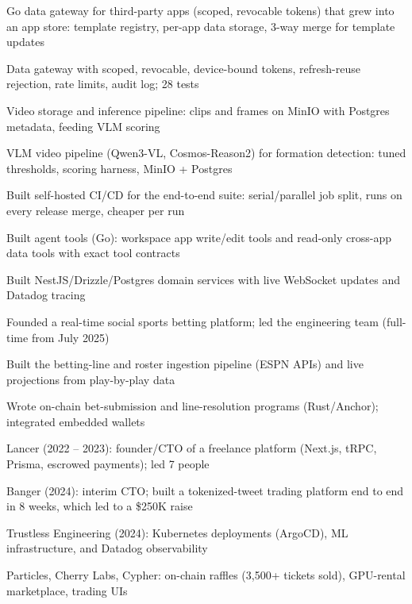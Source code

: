 \documentclass[print]{jack-resume}
\begin{document}
\begin{tightemize}
    \item Go data gateway for third-party apps (scoped, revocable tokens) that grew into an app store: template registry, per-app data storage, 3-way merge for template updates
    \item Data gateway with scoped, revocable, device-bound tokens, refresh-reuse rejection, rate limits, audit log; 28 tests
    \item Video storage and inference pipeline: clips and frames on MinIO with Postgres metadata, feeding VLM scoring
    \item VLM video pipeline (Qwen3-VL, Cosmos-Reason2) for formation detection: tuned thresholds, scoring harness, MinIO + Postgres
    \item Built self-hosted CI/CD for the end-to-end suite: serial/parallel job split, runs on every release merge, cheaper per run
    \item Built agent tools (Go): workspace app write/edit tools and read-only cross-app data tools with exact tool contracts
\end{tightemize}
\sectionsep

\begin{tightemize}
    \item Built NestJS/Drizzle/Postgres domain services with live WebSocket updates and Datadog tracing
    \item Founded a real-time social sports betting platform; led the engineering team (full-time from July 2025)
    \item Built the betting-line and roster ingestion pipeline (ESPN APIs) and live projections from play-by-play data
    \item Wrote on-chain bet-submission and line-resolution programs (Rust/Anchor); integrated embedded wallets
\end{tightemize}
\sectionsep

\begin{tightemize}
    \item Lancer (2022 – 2023): founder/CTO of a freelance platform (Next.js, tRPC, Prisma, escrowed payments); led 7 people
    \item Banger (2024): interim CTO; built a tokenized-tweet trading platform end to end in 8 weeks, which led to a \$250K raise
    \item Trustless Engineering (2024): Kubernetes deployments (ArgoCD), ML infrastructure, and Datadog observability
    \item Particles, Cherry Labs, Cypher: on-chain raffles (3,500+ tickets sold), GPU-rental marketplace, trading UIs
\end{tightemize}
\sectionsep
\end{document}
